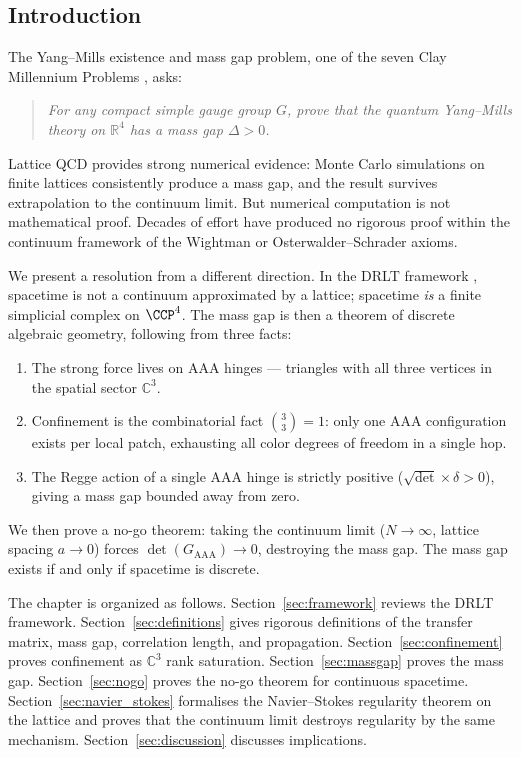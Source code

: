 \documentclass[12pt]{article}
\theoremstyle{remark}
\theoremstyle{definition}
\newcommand{\CC}{\mathbb{C}}
\newcommand{\RR}{\mathbb{R}}
\begin{document}
\subsection{Introduction}
\label{sec:intro}

The Yang--Mills existence and mass gap problem, one of the seven Clay
Millennium Problems \cite{Clay}, asks:

\begin{quote}
\emph{For any compact simple gauge group $G$, prove that the quantum
Yang--Mills theory on $\RR^4$ has a mass gap $\Delta > 0$.}
\end{quote}

\noindent
Lattice QCD \cite{Wilson, Creutz} provides strong numerical evidence:
Monte Carlo simulations on finite lattices consistently produce a mass
gap, and the result survives extrapolation to the continuum limit. But
numerical computation is not mathematical proof. Decades of effort have
produced no rigorous proof within the continuum framework of the Wightman
\cite{Wightman} or Osterwalder--Schrader \cite{OS} axioms.

We present a resolution from a different direction. In the DRLT framework
, spacetime is not a continuum approximated by a
lattice; spacetime \emph{is} a finite simplicial complex on
$\CCP^4$. The mass gap is then a theorem of discrete algebraic
geometry, following from three facts:

\begin{enumerate}
\item The strong force lives on AAA hinges --- triangles with all three
  vertices in the spatial sector $\CC^3$.
\item Confinement is the combinatorial fact $\binom{3}{3} = 1$: only one
  AAA configuration exists per local patch, exhausting all color degrees
  of freedom in a single hop.
\item The Regge action of a single AAA hinge is strictly positive
  ($\sqrt{\det} \times \delta > 0$), giving a mass gap bounded away
  from zero.
\end{enumerate}

We then prove a no-go theorem: taking the continuum limit
($N \to \infty$, lattice spacing $a \to 0$) forces
$\det(G_{\mathrm{AAA}}) \to 0$, destroying the mass gap. The mass gap
exists if and only if spacetime is discrete.

The chapter is organized as follows.
Section~\ref{sec:framework} reviews the DRLT framework.
Section~\ref{sec:definitions} gives rigorous definitions of the
transfer matrix, mass gap, correlation length, and propagation.
Section~\ref{sec:confinement} proves confinement as $\CC^3$ rank
saturation.  Section~\ref{sec:massgap} proves the mass gap.
Section~\ref{sec:nogo} proves the no-go theorem for continuous
spacetime.  Section~\ref{sec:navier_stokes} formalises the
Navier--Stokes regularity theorem on the lattice and proves that
the continuum limit destroys regularity by the same mechanism.
Section~\ref{sec:discussion} discusses implications.
\end{document}
